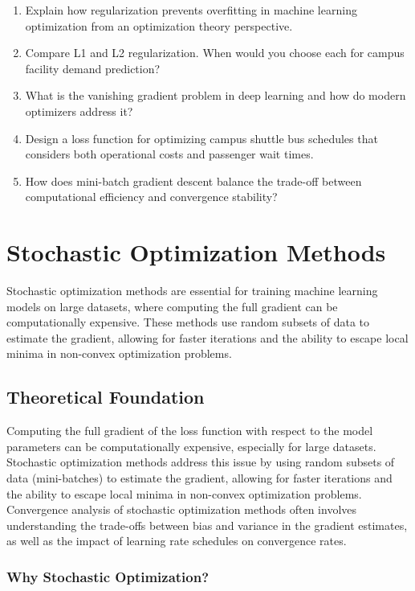 \documentclass[
  letterpaper,
  DIV=11,
  numbers=noendperiod]{scrreprt}
\begin{document}
\begin{enumerate}
\def\labelenumi{\arabic{enumi}.}
\item
  Explain how regularization prevents overfitting in machine learning
  optimization from an optimization theory perspective.
\item
  Compare L1 and L2 regularization. When would you choose each for
  campus facility demand prediction?
\item
  What is the vanishing gradient problem in deep learning and how do
  modern optimizers address it?
\item
  Design a loss function for optimizing campus shuttle bus schedules
  that considers both operational costs and passenger wait times.
\item
  How does mini-batch gradient descent balance the trade-off between
  computational efficiency and convergence stability?
\end{enumerate}

\section{Stochastic Optimization
Methods}\label{stochastic-optimization-methods}

Stochastic optimization methods are essential for training machine
learning models on large datasets, where computing the full gradient can
be computationally expensive. These methods use random subsets of data
to estimate the gradient, allowing for faster iterations and the ability
to escape local minima in non-convex optimization problems.

\subsection{Theoretical Foundation}\label{theoretical-foundation-13}

Computing the full gradient of the loss function with respect to the
model parameters can be computationally expensive, especially for large
datasets. Stochastic optimization methods address this issue by using
random subsets of data (mini-batches) to estimate the gradient, allowing
for faster iterations and the ability to escape local minima in
non-convex optimization problems. Convergence analysis of stochastic
optimization methods often involves understanding the trade-offs between
bias and variance in the gradient estimates, as well as the impact of
learning rate schedules on convergence rates.

\subsubsection{Why Stochastic
Optimization?}\label{why-stochastic-optimization}
\end{document}
